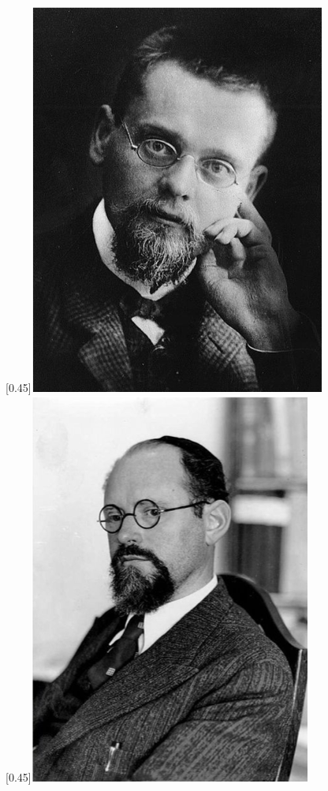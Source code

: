 \documentclass{article}
\begin{document}
\begin{figure}[htbp]
  \centering
  [0.45\linewidth]{\includegraphics[scale=0.7]{img/Zermelo.png}} \quad
  [0.45\linewidth]{\includegraphics[scale=0.7]{img/Fraenkel.png}}
  \captionsetup{labelformat=empty}
  \caption{}
  \label{fig:Zermelo-and-Fraenkel}
\end{figure}
\end{document}
